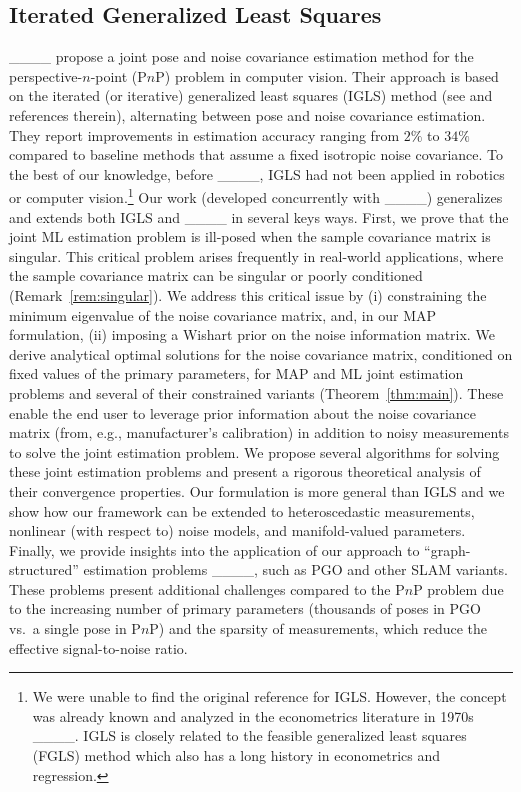 \subsection{Iterated Generalized Least Squares}
____ propose a joint pose and noise
covariance estimation method for the perspective-$n$-point (P$n$P) problem in
computer vision. Their approach is based on the iterated (or iterative)
generalized least squares (IGLS) method (see \cite[Chapter
12.5]{SeberWild200309} and references therein), alternating between pose
and noise covariance estimation. They report improvements in
estimation accuracy
ranging from $2\%$ to $34\%$ compared to baseline methods that assume a fixed
isotropic noise covariance.
To the best of our knowledge, before ____, IGLS had not been
applied in robotics or computer vision.\footnote{We were
unable to find the original reference for IGLS. However, the concept was already known
and analyzed in the econometrics literature in 1970s
____. IGLS is closely
related to the feasible generalized least squares (FGLS) method which also has a
long history in econometrics and regression.}
Our work (developed concurrently with
____) generalizes and extends both IGLS and 
____ in several keys ways.
First, we prove that the joint ML estimation problem is ill-posed when the sample covariance
matrix is singular. This critical problem arises frequently in
real-world applications, where the sample covariance matrix can be singular or
poorly conditioned (Remark~\ref{rem:singular}). We address this critical issue by
(i) constraining the minimum eigenvalue of the noise covariance matrix, and, in our MAP formulation, (ii) imposing a Wishart prior on the noise information
matrix. We derive analytical optimal solutions for the noise
covariance matrix, conditioned on fixed values of the primary parameters, for MAP
and ML joint estimation problems and several of their constrained variants
(Theorem~\ref{thm:main}). These enable the end user to leverage prior information
about the noise covariance matrix (from, e.g., manufacturer's calibration) in
addition to noisy measurements to solve the joint estimation problem. We propose several algorithms for
solving these joint estimation problems and present a rigorous theoretical
analysis of their convergence properties.  Our formulation is more general than
IGLS and we show how our framework can be extended to heteroscedastic
measurements, nonlinear (with respect to) noise models, and manifold-valued
parameters.  Finally, we provide insights into the application of our approach
to ``graph-structured'' estimation problems ____, such
as PGO and other SLAM variants. These problems present
additional challenges compared to the P$n$P problem due to the increasing number
of primary parameters (thousands of poses in PGO vs.\ a single pose in P$n$P) and
the sparsity of measurements, which reduce the effective signal-to-noise ratio.


